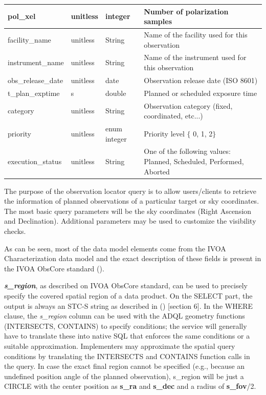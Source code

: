 \documentclass[11pt,a4paper]{ivoa}
\begin{document}
\begin{landscape}
\begin{table}
\begin{tabular}{ |l|l|l|l| }
\hline
pol\_xel & 
unitless & 
integer & 
Number of polarization samples \\
\hline
facility\_name & 
unitless & 
String & 
Name of the facility used for this observation \\
\hline
instrument\_name & 
unitless & 
String & 
Name of the instrument used for this observation \\
\hline
obs\_release\_date & 
unitless & 
date & 
Observation release date (ISO 8601) \\
\hline
t\_plan\_exptime & 
s & 
double & 
Planned or scheduled exposure time \\
\hline
category & 
unitless & 
String & 
Observation category (fixed, coordinated, etc...) \\
\hline
priority & 
unitless & 
enum integer & 
Priority level $ \{ $ 0, 1, 2$ \} $ \\
\hline
execution\_status & 
unitless & 
String & 
One of the following values:  Planned, Scheduled, Performed, Aborted \\
\hline
\end{tabular}
\end{table}
\end{landscape}


The purpose of the observation locator query is to allow users/clients to retrieve the information of planned observations of a particular target or sky coordinates. The most basic query parameters will be the sky coordinates (Right Ascension and Declination). Additional parameters may be used to customize the visibility checks.

As can be seen, most of the data model elements come from the IVOA Characterization data model and the exact description of these fields is present in the IVOA ObsCore standard (\cite{Lou17}).

\textbf{\textit{s\_region}}, as described on IVOA ObsCore standard, can be used to precisely specify the covered spatial region of a data product. On the SELECT part, the output is always an STC-S string as described in (\cite{TAP}) [section 6]. In the WHERE clause, the \textit{s\_region} column can be used with the ADQL geometry functions (INTERSECTS, CONTAINS) to specify conditions; the service will generally have to translate these into native SQL that enforces the same conditions or a suitable approximation. Implementers may approximate the spatial query conditions by translating the INTERSECTS and CONTAINS function calls in the query. In case the exact final region cannot be specified (e.g., because an undefined position angle of the planned observation), s\_region will be just a CIRCLE with the center position as \textbf{s\_ra} and \textbf{s\_dec} and a radius of \textbf{s\_fov}/2.
\end{document}
